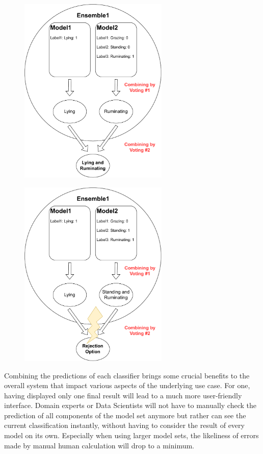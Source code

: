   \begin{figure}[htbp]
    \centering
    \begin{minipage}{.5\textwidth}
      \centering
      \includegraphics[height=9cm]{graphics/combining.pdf}
      \label{fig:combining}
    \end{minipage}%
    \begin{minipage}{.5\textwidth}
      \centering
      \includegraphics[height=9cm]{graphics/combiningrejection.pdf}
      \label{fig:combiningrejection}
    \end{minipage}
    \end{figure}


Combining the predictions of each classifier brings some crucial benefits to the overall system that impact various aspects of the underlying use case. For one, having displayed only one final result will lead to a much more user-friendly interface. Domain experts or Data Scientists will not have to manually check the prediction of all components of the model set anymore but rather can see the current classification instantly, without having to consider the result of every model on its own. Especially when using larger model sets, the likeliness of errors made by manual human calculation will drop to a minimum. 

